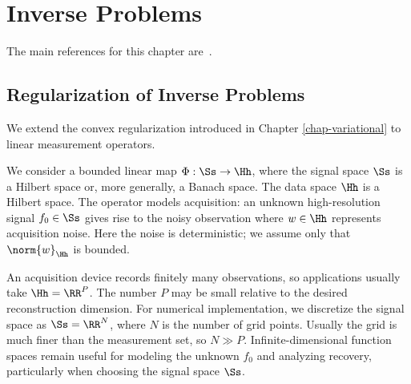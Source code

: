
\chapter{Inverse Problems}
\label{chap-invpbm}

The main references for this chapter are~\cite{mallat2008wavelet,scherzer2009variational,engl1996regularization}.

\section{Regularization of Inverse Problems}

We extend the convex regularization introduced in Chapter \ref{chap-variational} to linear measurement operators.

We consider a bounded linear map $\Phi : \Ss \rightarrow \Hh$, where the signal space $\Ss$ is a Hilbert space or, more generally, a Banach space. The data space $\Hh$ is a Hilbert space.
%
The operator models acquisition: an unknown high-resolution signal $f_0 \in \Ss$ gives rise to the noisy observation
where $w \in \Hh$ represents acquisition noise. Here the noise is deterministic; we assume only that $\norm{w}_\Hh$ is bounded.

An acquisition device records finitely many observations, so applications usually take $\Hh=\RR^P$. The number $P$ may be small relative to the desired reconstruction dimension.
%
For numerical implementation, we discretize the signal space as $\Ss=\RR^N$, where $N$ is the number of grid points. Usually the grid is much finer than the measurement set, so $N \gg P$.
%
Infinite-dimensional function spaces remain useful for modeling the unknown $f_0$ and analyzing recovery, particularly when choosing the signal space $\Ss$.

